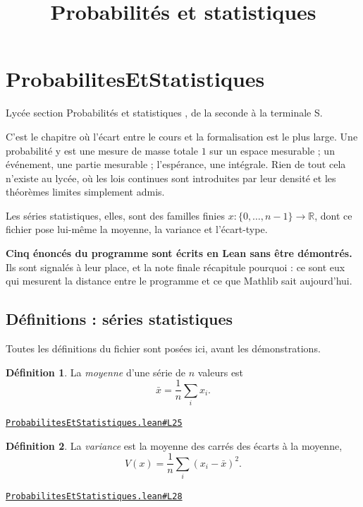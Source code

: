 \documentclass[11pt,a4paper]{article}
\title{Probabilités et statistiques}
\date{}
\theoremstyle{definition}
\newtheorem{definition}{Définition}
\theoremstyle{plain}
\newcommand{\source}[2]{\par\smallskip\noindent\hfill{\footnotesize\href{#1}{\texttt{#2}}}\par\smallskip}
\begin{document}
\maketitle
\sloppy

\section{ProbabilitesEtStatistiques}

\noindent
Lycée \textemdash{} section \og{} Probabilités et statistiques \fg{}, de la seconde à la
terminale S.

\medskip\noindent
C'est le chapitre où l'écart entre le cours et la formalisation est le plus large. Une
probabilité y est une mesure de masse totale $1$ sur un espace mesurable ; un événement,
une partie mesurable ; l'espérance, une intégrale. Rien de tout cela n'existe au lycée, où
les lois continues sont introduites par leur densité et les théorèmes limites simplement
admis.

\medskip\noindent
Les séries statistiques, elles, sont des familles finies $x : \{0, \dots, n-1\} \to
\mathbb{R}$, dont ce fichier pose lui-même la moyenne, la variance et l'écart-type.

\medskip\noindent
\textbf{Cinq énoncés du programme sont écrits en Lean sans être démontrés.} Ils sont
signalés à leur place, et la note finale récapitule pourquoi : ce sont eux qui mesurent la
distance entre le programme et ce que Mathlib sait aujourd'hui.

\subsection{Définitions : séries statistiques}

\noindent
Toutes les définitions du fichier sont posées ici, avant les démonstrations.

\begin{definition}
La \emph{moyenne} d'une série de $n$ valeurs est
\[ \bar x = \frac{1}{n}\sum_{i} x_i . \]
\end{definition}
\source{https://github.com/Commutator-IO/learn-lean/blob/main/courses/02-lycee/09-probabilites-et-statistiques/ProbabilitesEtStatistiques.lean\#L25}{ProbabilitesEtStatistiques.lean\#L25}

\begin{definition}
La \emph{variance} est la moyenne des carrés des écarts à la moyenne,
\[ V(x) = \frac{1}{n}\sum_{i} (x_i - \bar x)^{2} . \]
\end{definition}
\source{https://github.com/Commutator-IO/learn-lean/blob/main/courses/02-lycee/09-probabilites-et-statistiques/ProbabilitesEtStatistiques.lean\#L28}{ProbabilitesEtStatistiques.lean\#L28}
\end{document}
